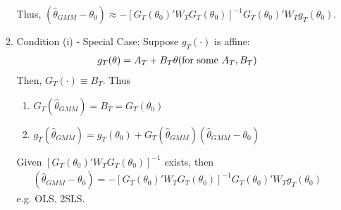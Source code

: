 \documentclass[11pt]{elegantbook}
\begin{document}
\begin{remark}
\begin{enumerate}
\begin{enumerate}
\begin{enumerate}
            \end{enumerate}
            Thus, $\left(\hat{\theta}_{GMM}-\theta_0\right)\approx -\left[G_T(\theta_0)'W_TG_T(\theta_0)\right]^{-1}G_T(\theta_0)'W_Tg_T(\theta_0)$.
            \item Condition (i) - Special Case:
            Suppose $g_T(\cdot)$ is affine:
            \begin{equation}
                \begin{aligned}
                    g_T(\theta)=A_T+B_T\theta (\textnormal{for some }A_T,B_T)
                \end{aligned}
                \nonumber
            \end{equation}
            Then, $G_T(\cdot)\equiv B_T$. Thus
            \begin{enumerate}
                \item $G_T(\hat{\theta}_{GMM})= B_T = G_T(\theta_0)$
                \item $g_T(\hat{\theta}_{GMM})= g_T(\theta_0)+G_T(\hat{\theta}_{GMM})\left(\hat{\theta}_{GMM}-\theta_0\right)$
            \end{enumerate}
            Given $\left[G_T(\theta_0)'W_TG_T(\theta_0)\right]^{-1}$ exists, then
            \begin{equation}
                \begin{aligned}
                    \left(\hat{\theta}_{GMM}-\theta_0\right)= -\left[G_T(\theta_0)'W_TG_T(\theta_0)\right]^{-1}G_T(\theta_0)'W_Tg_T(\theta_0)
                \end{aligned}
                \nonumber
            \end{equation}
            e.g. OLS, 2SLS.
        \end{enumerate}
    \end{enumerate}
\end{remark}
\end{document}
